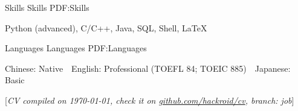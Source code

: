 \documentclass[a4paper,MMMyyyy,nonstopmode]{simpleresumecv}
\newcommand{\CVNote}{CV compiled on {\today}, check it on \href{https://github.com/hackroid/cv}{github.com/hackroid/cv}, branch: job}
\begin{document}
\begin{Body}

    \Section
    {Skills}
    {Skills}
    {PDF:Skills}

    \Entry
    \BulletItem
    Python (advanced),
    C/C++,
    Java,
    SQL,
    Shell,
    {\LaTeX}



    \Section
    {Languages}
    {Languages}
    {PDF:Languages}

    \BulletItem
    Chinese: Native \,\BulletSymbol\, English: Professional (TOEFL 84; TOEIC 885) \,\BulletSymbol\, Japanese: Basic









\end{Body}


\UseNoteFont%
\null\hfill%
[\textit{\CVNote}]
\end{document}
